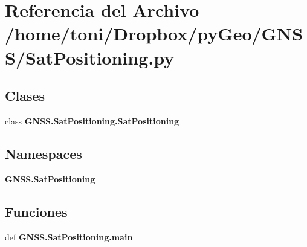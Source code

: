 \section{Referencia del Archivo /home/toni/\-Dropbox/py\-Geo/\-G\-N\-S\-S/\-Sat\-Positioning.py}
\label{SatPositioning_8py}
\subsection*{Clases}
\begin{DoxyCompactItemize}
\item 
class {\bf G\-N\-S\-S.\-Sat\-Positioning.\-Sat\-Positioning}
\end{DoxyCompactItemize}
\subsection*{Namespaces}
\begin{DoxyCompactItemize}
\item 
{\bf G\-N\-S\-S.\-Sat\-Positioning}
\end{DoxyCompactItemize}
\subsection*{Funciones}
\begin{DoxyCompactItemize}
\item 
def {\bf G\-N\-S\-S.\-Sat\-Positioning.\-main}
\end{DoxyCompactItemize}
